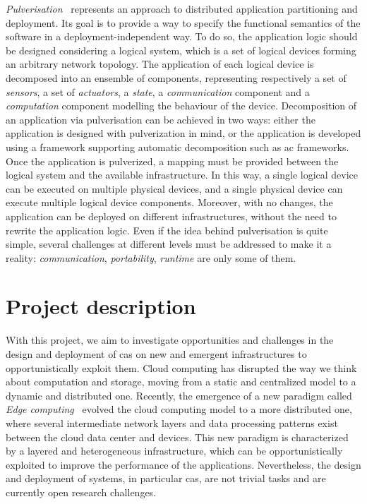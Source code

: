 \documentclass[12pt]{article}
\begin{document}
\emph{Pulverisation}~\cite{fi12110203} represents an approach to distributed application partitioning and deployment.
%
Its goal is to provide a way to specify the functional semantics of the software in a deployment-independent way.
%
To do so,
the application logic should be designed considering a logical system,
which is a set of logical devices forming an arbitrary network topology.
%
The application of each logical device is decomposed into an ensemble of components,
representing respectively a set of \emph{sensors},
a set of \emph{actuators},
a \emph{state},
a \emph{communication} component and a \emph{computation} component modelling the behaviour of the device.
%
Decomposition of an application via pulverisation can be achieved in two ways:
either the application is designed with pulverization in mind,
or the application is developed using a framework supporting automatic decomposition such as \ac{ac} frameworks.
%
Once the application is pulverized,
a mapping must be provided between the logical system and the available infrastructure.
%
In this way,
a single logical device can be executed on multiple physical devices,
and a single physical device can execute multiple logical device components.
%
Moreover,
with no changes,
the application can be deployed on different infrastructures,
without the need to rewrite the application logic.
%
Even if the idea behind pulverisation is quite simple,
several challenges at different levels must be addressed to make it a reality:
\emph{communication}, \emph{portability}, \emph{runtime} are only some of them.

\section{Project description}\label{sec:project-description}

With this project,
we aim to investigate opportunities and challenges in the design and deployment of
\ac{cas} on new and emergent infrastructures to opportunistically exploit them.
%
Cloud computing has disrupted the way we think about computation and storage,
moving from a static and centralized model to a dynamic and distributed one.
%
Recently,
the emergence of a new paradigm called \emph{Edge computing}~\cite{mao2017survey,8123913}
evolved the cloud computing model to a more distributed one,
where several intermediate network layers and data processing patterns exist between the cloud data center and devices.
%
This new paradigm is characterized by a layered and heterogeneous infrastructure,
which can be opportunistically exploited to improve the performance of the applications.
%
Nevertheless,
the design and deployment of systems, in particular \ac{cas},
are not trivial tasks and are currently open research challenges.
\end{document}

